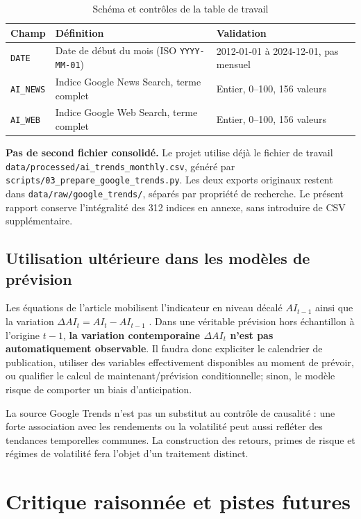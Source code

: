 \documentclass[11pt,a4paper]{article}
\begin{document}
\begin{table}[H]\centering\small
\caption{Schéma et contrôles de la table de travail}
\begin{tabularx}{\textwidth}{@{}lYY@{}}\toprule
Champ & Définition & Validation\\\midrule
\texttt{DATE} & Date de début du mois (ISO \texttt{YYYY-MM-01}) & 2012-01-01 à 2024-12-01, pas mensuel\\
\texttt{AI\_NEWS} & Indice Google News Search, terme complet & Entier, 0--100, 156 valeurs\\
\texttt{AI\_WEB} & Indice Google Web Search, terme complet & Entier, 0--100, 156 valeurs\\\bottomrule
\end{tabularx}\end{table}

\textbf{Pas de second fichier consolidé.} Le projet utilise déjà le fichier de travail
\texttt{data/processed/ai\_trends\_monthly.csv}, généré par
\texttt{scripts/03\_prepare\_google\_trends.py}. Les deux exports originaux restent
dans \texttt{data/raw/google\_trends/}, séparés par propriété de recherche.
Le présent rapport conserve l'intégralité des 312 indices en annexe, sans introduire de CSV supplémentaire.

\subsection{Utilisation ultérieure dans les modèles de prévision}
Les équations de l'article mobilisent l'indicateur en niveau décalé \(AI_{t-1}\) ainsi que la variation \(\Delta AI_t=AI_t-AI_{t-1}\) \cite{SalisuBadmus2026}. Dans une véritable prévision hors échantillon à l'origine \(t-1\), \textbf{la variation contemporaine \(\Delta AI_t\) n'est pas automatiquement observable}. Il faudra donc expliciter le calendrier de publication, utiliser des variables effectivement disponibles au moment de prévoir, ou qualifier le calcul de maintenant/prévision conditionnelle; sinon, le modèle risque de comporter un biais d'anticipation.

La source Google Trends n'est pas un substitut au contrôle de causalité : une forte association avec les rendements ou la volatilité peut aussi refléter des tendances temporelles communes. La construction des retours, primes de risque et régimes de volatilité fera l'objet d'un traitement distinct.

\section{Critique raisonnée et pistes futures}
\end{document}
